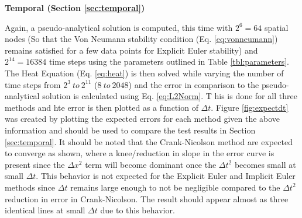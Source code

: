 \documentclass[10pt, letter, showtrims]{extarticle}
\begin{document}
		\noindent
		\textbf{Temporal (Section \ref{sec:temporal})}
		
		\noindent
		Again, a pseudo-analytical solution is computed, this time with $2^{6} = 64$ spatial nodes (So that the Von Neumann stability condition (Eq. \ref{eq:vonneumann}) remains satisfied for a few data points for Explicit Euler stability) and $2^{14} = 16384$ time steps using the parameters outlined in Table \ref{tbl:parameters}. The Heat Equation (Eq. \ref{eq:heat}) is then solved while varying the number of time steps from $2^{3}\ to\ 2^{11}$ ($8\ to\ 2048$) and the error in comparison to the pseudo-analytical solution is calculated using Eq. \ref{eq:L2Norm}. T his is done for all three methods and hte error is then plotted as a function of $\Delta t$. Figure \ref{fig:expectdt} was created by plotting the expected errors for each method given the above information and should be used to compare the test results in Section \ref{sec:temporal}. It should be noted that the Crank-Nicolson method are expected to converge as shown, where a knee/reduction in slope in the error curve is present since the $\Delta x^{2}$ term will become dominant once the $\Delta t^{2}$ becomes small at small $\Delta t$. This behavior is not expected for the Explicit Euler and Implicit Euler methods since $\Delta t$ remains large enough to not be negligible compared to the $\Delta t^{2}$ reduction in error in Crank-Nicolson. The result should appear almost as three identical lines at small $\Delta t$ due to this behavior.
		
\end{document}
